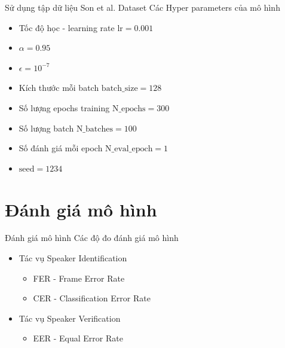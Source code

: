 \documentclass[notheorems, aspectratio=54]{beamer}
\begin{document}
\begin{frame}{Sử dụng tập dữ liệu Son et al. Dataset}
	Các Hyper parameters của mô hình
	\begin{itemize}
		\item Tốc độ học - learning rate $\text{lr} = 0.001$
		\item $\alpha = 0.95$
		\item $\epsilon = 10^{-7}$
		\item Kích thước mỗi batch $\text{batch\_size}=128$
		\item Số lượng epochs training $\text{N\_epochs}=300$
		\item Số lượng batch $\text{N\_batches}=100$
		\item Số đánh giá mỗi epoch $\text{N\_eval\_epoch}=1$
		\item $\text{seed}=1234$
	\end{itemize}
\end{frame}
\section{Đánh giá mô hình}
\begin{frame}{Đánh giá mô hình}
	Các độ đo đánh giá mô hình
	\begin{itemize}
		\item Tác vụ Speaker Identification
		\begin{itemize}
			\item FER - Frame Error Rate
			\item CER - Classification Error Rate
		\end{itemize}
		\item Tác vụ Speaker Verification
		\begin{itemize}
			\item EER - Equal Error Rate
		\end{itemize}
	\end{itemize}
\end{frame}
\end{document}
